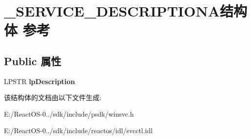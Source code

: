 \hypertarget{struct___s_e_r_v_i_c_e___d_e_s_c_r_i_p_t_i_o_n_a}{}\section{\+\_\+\+S\+E\+R\+V\+I\+C\+E\+\_\+\+D\+E\+S\+C\+R\+I\+P\+T\+I\+O\+N\+A结构体 参考}
\label{struct___s_e_r_v_i_c_e___d_e_s_c_r_i_p_t_i_o_n_a}
\subsection*{Public 属性}
\begin{DoxyCompactItemize}
\item 
\mbox{\label{struct___s_e_r_v_i_c_e___d_e_s_c_r_i_p_t_i_o_n_a_a0931b197b7f1b5aed93f63128e081a12}} 
L\+P\+S\+TR {\bfseries lp\+Description}
\end{DoxyCompactItemize}


该结构体的文档由以下文件生成\+:\begin{DoxyCompactItemize}
\item 
E\+:/\+React\+O\+S-\/0../sdk/include/psdk/winsvc.\+h\item 
E\+:/\+React\+O\+S-\/0../sdk/include/reactos/idl/svcctl.\+idl\end{DoxyCompactItemize}
